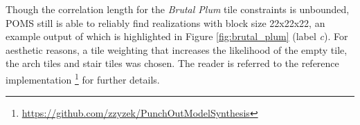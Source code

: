 Though the correlation length for the \textit{Brutal Plum} tile constraints is unbounded, POMS still is able to reliably find realizations with
block size 22x22x22, an example output of which is highlighted in Figure \ref{fig:brutal_plum} (label \textit{c}).
For aesthetic reasons, a tile weighting that increases the likelihood of the empty tile, the arch tiles and
stair tiles was chosen.
The reader is referred to the reference implementation \footnote{ \label{poms-url} \url{https://github.com/zzyzek/PunchOutModelSynthesis} }
for further details.


